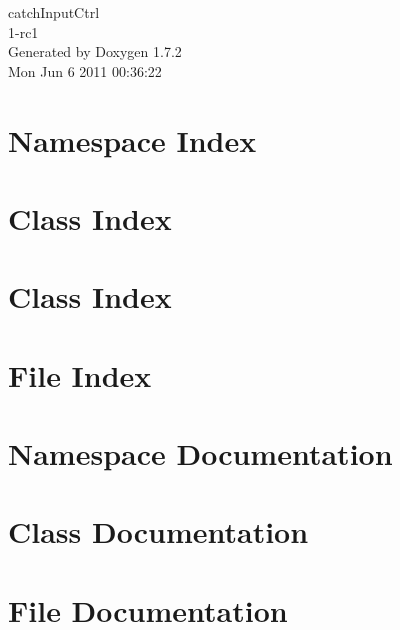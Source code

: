 \documentclass[a4paper]{book}
\begin{document}
\hypersetup{pageanchor=false}
\begin{titlepage}
\vspace*{7cm}
\begin{center}
{\Large catchInputCtrl \\[1ex]\large 1-\/rc1 }\\
\vspace*{1cm}
{\large Generated by Doxygen 1.7.2}\\
\vspace*{0.5cm}
{\small Mon Jun 6 2011 00:36:22}\\
\end{center}
\end{titlepage}
\clearemptydoublepage
{}
\tableofcontents
\clearemptydoublepage
{}
\hypersetup{pageanchor=true}
\chapter{Namespace Index}

\chapter{Class Index}

\chapter{Class Index}

\chapter{File Index}

\chapter{Namespace Documentation}

\chapter{Class Documentation}




\chapter{File Documentation}










\printindex
\end{document}
